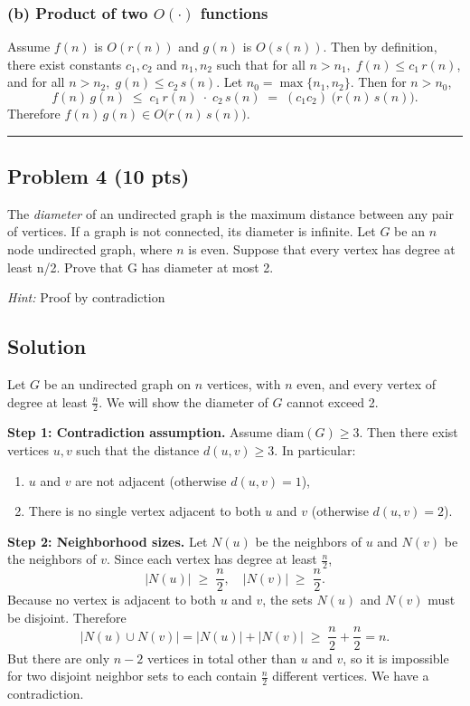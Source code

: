 \documentclass[12pt]{article}
\begin{document}
\subsubsection*{(b) Product of two $O(\cdot)$ functions}

Assume \(f(n)\) is \(O(r(n))\) and \(g(n)\) is \(O(s(n))\). Then by definition, there exist constants \(c_1,c_2\) and \(n_1,n_2\) such that for all \(n>n_1,\; f(n)\le c_1\,r(n)\), and for all \(n>n_2,\; g(n)\le c_2\,s(n)\). Let \(n_0 = \max\{n_1,n_2\}\). Then for \(n>n_0\),
\[
f(n)\,g(n) \;\le\; c_1\,r(n)\;\cdot\;c_2\,s(n)
\;=\; (c_1 c_2)\;\bigl(r(n)\,s(n)\bigr).
\]
Therefore \(f(n)\,g(n)\in O\bigl(r(n)\,s(n)\bigr)\). 

\hrule
\vspace{1em}


\subsection*{Problem 4 (10 pts)}
The \textit{diameter} of an undirected graph is the maximum distance between any pair of vertices. If a graph is not connected, its diameter is infinite. Let $G$ be an $n$ node undirected graph, where $n$ is even. Suppose that every vertex has degree at least n/2. Prove that G has diameter at most 2.

\textit{Hint:} Proof by contradiction

\subsection*{Solution}

Let \(G\) be an undirected graph on \(n\) vertices, with \(n\) even, and every vertex of degree at least \(\tfrac{n}{2}\). We will show the diameter of \(G\) cannot exceed 2.

\bigskip
\textbf{Step 1: Contradiction assumption.}
Assume \(\mathrm{diam}(G)\ge3\). Then there exist vertices \(u,v\) such that the distance \(d(u,v)\ge3\). In particular:
\begin{enumerate}
    \item \(u\) and \(v\) are not adjacent (otherwise \(d(u,v)=1\)),
    \item There is no single vertex adjacent to both \(u\) and \(v\) (otherwise \(d(u,v)=2\)).
\end{enumerate}

\bigskip
\textbf{Step 2: Neighborhood sizes.}
Let \(N(u)\) be the neighbors of \(u\) and \(N(v)\) be the neighbors of \(v\). Since each vertex has degree at least \(\tfrac{n}{2}\),
\[
|N(u)| \;\ge\; \frac{n}{2}, 
\quad
|N(v)| \;\ge\; \frac{n}{2}.
\]
Because no vertex is adjacent to both \(u\) and \(v\), the sets \(N(u)\) and \(N(v)\) must be disjoint. Therefore
\[
|N(u)\cup N(v)| = |N(u)| + |N(v)|
\;\ge\; \frac{n}{2} + \frac{n}{2}
= n.
\]
But there are only \(n-2\) vertices in total other than \(u\) and \(v\), so it is impossible for two disjoint neighbor sets to each contain \(\tfrac{n}{2}\) different vertices. We have a contradiction.
\end{document}
